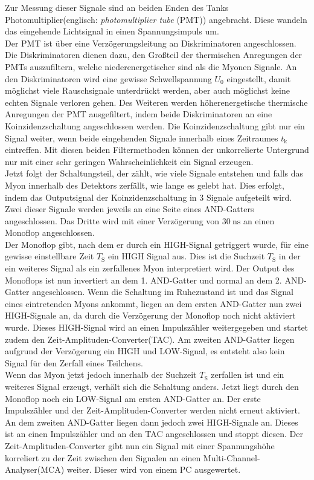     Zur Messung dieser Signale sind an beiden Enden des Tanks Photomultiplier(englisch: \textit{photomultiplier tube} (PMT)) angebracht. 
    Diese wandeln das eingehende Lichtsignal in einen Spannungsimpuls um. \\
    Der PMT ist über eine Verzögerungsleitung an Diskriminatoren angeschlossen.
    Die Diskriminatoren dienen dazu, den Großteil der thermischen Anregungen der PMTs auszufiltern, welche niederenergetischer sind als die Myonen Signale.
    An den Diskriminatoren wird eine gewisse Schwellspannung $U_0$ eingestellt, damit möglichst viele Rauschsignale unterdrückt werden, aber auch möglichst keine echten Signale verloren gehen.
    Des Weiteren werden höherenergetische thermische Anregungen der PMT ausgefiltert, indem beide Diskriminatoren an eine Koinzidenzschaltung angeschlossen werden.
    Die Koinzidenzschaltung gibt nur ein Signal weiter, wenn beide eingehenden Signale innerhalb eines Zeitraumes $t_\text{k}$ eintreffen.
    Mit diesen beiden Filtermethoden können der unkorrelierte Untergrund nur mit einer sehr geringen Wahrscheinlichkeit ein Signal erzeugen.\\
    Jetzt folgt der Schaltungsteil, der zählt, wie viele Signale entstehen und falls das Myon innerhalb des Detektors zerfällt, wie lange es gelebt hat.
    Dies erfolgt, indem das Outputsignal der Koinzidenzschaltung in 3 Signale aufgeteilt wird.
    Zwei dieser Signale werden jeweils an eine Seite eines AND-Gatters angeschlossen. 
    Das Dritte wird mit einer Verzögerung von $\SI{30}{\nano\second}$ an einen Monoflop angeschlossen.\\
    Der Monoflop gibt, nach dem er durch ein HIGH-Signal getriggert wurde, für eine gewisse einstellbare Zeit $T_\text{S}$ ein HIGH Signal aus. 
    Dies ist die Suchzeit $T_\text{S}$ in der ein weiteres Signal als ein zerfallenes Myon interpretiert wird.
    Der Output des Monoflops ist nun invertiert an dem 1. AND-Gatter und normal an dem 2. AND-Gatter angeschlossen.
    Wenn die Schaltung im Ruhezustand ist und das Signal eines eintretenden Myons ankommt, 
    liegen an dem ersten AND-Gatter nun zwei HIGH-Signale an, da durch die Verzögerung der Monoflop noch nicht aktiviert wurde.
    Dieses HIGH-Signal wird an einen Impulszähler weitergegeben und startet zudem den Zeit-Amplituden-Converter(TAC).
    Am zweiten AND-Gatter liegen aufgrund der Verzögerung ein HIGH und LOW-Signal, es entsteht also kein Signal für den Zerfall eines Teilchens.\\
    Wenn das Myon jetzt jedoch innerhalb der Suchzeit $T_\text{S}$ zerfallen ist und ein weiteres Signal erzeugt, verhält sich die Schaltung anders.
    Jetzt liegt durch den Monoflop noch ein LOW-Signal am ersten AND-Gatter an.
    Der erste Impulszähler und der Zeit-Amplituden-Converter werden nicht erneut aktiviert.
    An dem zweiten AND-Gatter liegen dann jedoch zwei HIGH-Signale an. Dieses ist an einen Impulszähler und an den TAC angeschlossen und stoppt diesen.
    Der Zeit-Amplituden-Converter gibt nun ein Signal mit einer Spannungshöhe korreliert zu der Zeit zwischen den Signalen an einen Multi-Channel-Analyser(MCA) weiter.
    Dieser wird von einem PC ausgewertet.

